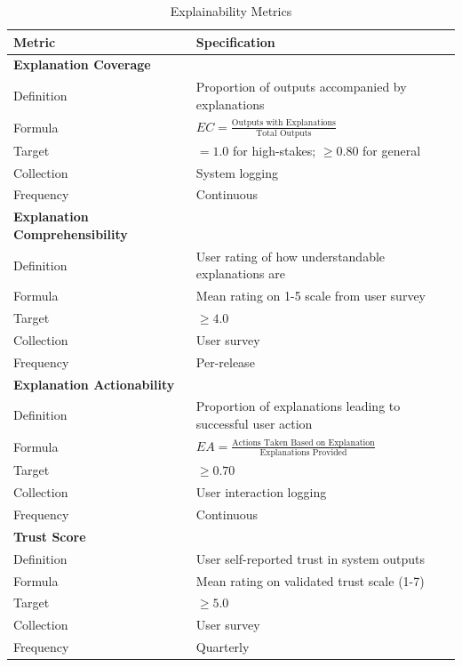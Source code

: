 \begin{table}[!htbp]
\centering
\caption{Explainability Metrics}
\label{tab:explainability_metrics}
\small
\begin{tabularx}{\linewidth}{@{}l X@{}}
\toprule
\textbf{Metric} & \textbf{Specification} \\
\midrule
\textbf{Explanation Coverage} & \\
Definition & Proportion of outputs accompanied by explanations \\
Formula & $EC = \frac{\text{Outputs with Explanations}}{\text{Total Outputs}}$ \\
Target & $= 1.0$ for high-stakes; $\geq 0.80$ for general \\
Collection & System logging \\
Frequency & Continuous \\
\addlinespace

\textbf{Explanation Comprehensibility} & \\
Definition & User rating of how understandable explanations are \\
Formula & Mean rating on 1-5 scale from user survey \\
Target & $\geq 4.0$ \\
Collection & User survey \\
Frequency & Per-release \\
\addlinespace

\textbf{Explanation Actionability} & \\
Definition & Proportion of explanations leading to successful user action \\
Formula & $EA = \frac{\text{Actions Taken Based on Explanation}}{\text{Explanations Provided}}$ \\
Target & $\geq 0.70$ \\
Collection & User interaction logging \\
Frequency & Continuous \\
\addlinespace

\textbf{Trust Score} & \\
Definition & User self-reported trust in system outputs \\
Formula & Mean rating on validated trust scale (1-7) \\
Target & $\geq 5.0$ \\
Collection & User survey \\
Frequency & Quarterly \\
\bottomrule
\end{tabularx}
\end{table}

